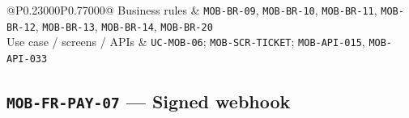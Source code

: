 \begin{longtable}{@{}P{0.23000\SRSWidth}P{0.77000\SRSWidth}@{}}
Business rules & \texttt{MOB-\allowbreak{}BR-\allowbreak{}09}, \texttt{MOB-\allowbreak{}BR-\allowbreak{}10}, \texttt{MOB-\allowbreak{}BR-\allowbreak{}11}, \texttt{MOB-\allowbreak{}BR-\allowbreak{}12}, \texttt{MOB-\allowbreak{}BR-\allowbreak{}13}, \texttt{MOB-\allowbreak{}BR-\allowbreak{}14}, \texttt{MOB-\allowbreak{}BR-\allowbreak{}20} \\[3pt]
Use case /\allowbreak{} screens /\allowbreak{} APIs & \texttt{UC-\allowbreak{}MOB-\allowbreak{}06}; \texttt{MOB-\allowbreak{}SCR-\allowbreak{}TICKET}; \texttt{MOB-\allowbreak{}API-\allowbreak{}015}, \texttt{MOB-\allowbreak{}API-\allowbreak{}033} \\[3pt]
\end{longtable}
\endgroup

\subsection{\texttt{MOB-\allowbreak{}FR-\allowbreak{}PAY-\allowbreak{}07} — Signed webhook}
\begingroup
\fontsize{9.5}{12}\selectfont
\setlength{\SRSWidth}{\dimexpr\linewidth-2\tabcolsep\relax}
